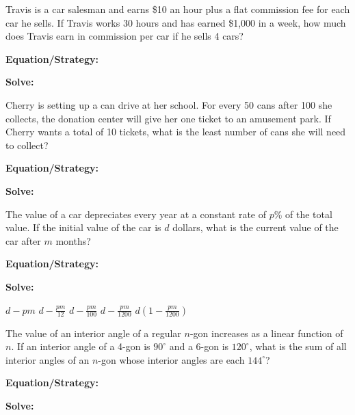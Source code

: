 \vfill
\newpage
\begin{multicols*}{2}
\begin{outline}[enumerate]
\medium

\1 Travis is a car salesman and earns \$10 an hour plus a flat commission fee for each car he sells. If Travis works 30 hours and has earned \$1,000 in a week, how much does Travis earn in commission per car if he sells 4 cars?

\bigskip
\textbf{Equation/Strategy:} \hrulefill

\bigskip
\textbf{Solve:}

\vfill
{}

\midline

\1 Cherry is setting up a can drive at her school. For every 50 cans after 100 she collects, the donation center will give her one ticket to an amusement park. If Cherry wants a total of 10 tickets, what is the least number of cans she will need to collect?

\bigskip
\textbf{Equation/Strategy:} \hrulefill

\bigskip
\textbf{Solve:}

\vfill
{}

\columnbreak
\advanced

\1 The value of a car depreciates every year at a constant rate of $p$\% of the total value. If the initial value of the car is $d$ dollars, what is the current value of the car after $m$ months?

\bigskip
\textbf{Equation/Strategy:} \hrulefill

\bigskip
\textbf{Solve:}

\vfill
\2 $d-pm$
\2 $d-\frac{pm}{12}$
\2 $d-\frac{pm}{100}$
\2 $d-\frac{pm}{1200}$
\2 $d\left(1-\frac{pm}{1200}\right)$

\midline

\1 The value of an interior angle of a regular $n$-gon increases as a linear function of $n$. If an interior angle of a 4-gon is $90^\circ$ and a 6-gon is $120^\circ$, what is the sum of all interior angles of an $n$-gon whose interior angles are each $144^\circ$?

\bigskip
\textbf{Equation/Strategy:} \hrulefill

\bigskip
\textbf{Solve:}

\vfill
{}
\end{outline}
\end{multicols*}